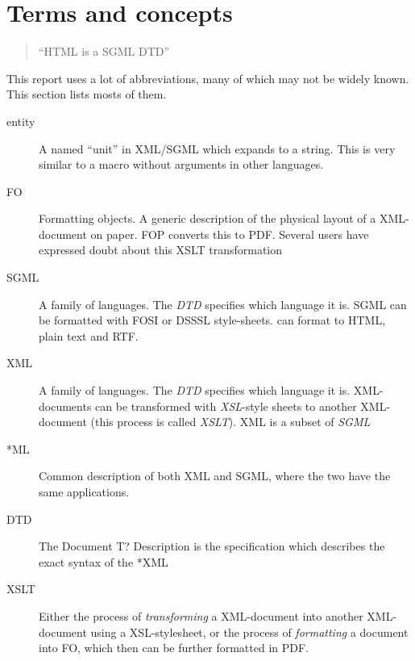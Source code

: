 
\chapter{Terms and concepts}
\label{cha:terms-and-concepts}

\begin{quotation}
  ``HTML is a SGML DTD''
\end{quotation}

This report uses a lot of abbreviations, many of which may not be
widely known.  This section lists mosts of them.

\begin{description}

\item[entity] A named ``unit'' in XML/SGML which expands to a string.
  This is very similar to a macro without arguments in other
  languages.
  
\item[FO] Formatting objects.  A generic description of the physical
  layout of a XML-document on paper.  FOP converts this to PDF.
  \textsf{Several users have expressed doubt about this XSLT
    transformation}
  
\item[SGML] A family of languages.  The \textit{DTD} specifies which
  language it is.  SGML can be formatted with FOSI or DSSSL
  style-sheets.   can format to HTML, plain text and
  RTF. 
  
\item[XML] A family of languages.  The \textit{DTD} specifies which
  language it is.  XML-documents can be transformed with
  \textit{XSL}-style sheets to another XML-document (this process is
  called \textit{XSLT}).  XML is a subset of \textit{SGML}


\item[*ML] Common description of both XML and SGML, where the two have
  the same applications.

\item[DTD] The \textsf{Document T? Description} is the specification
  which describes the exact syntax of the *XML


\item[XSLT] Either the process of \textit{transforming} a XML-document into
  another XML-document using a XSL-stylesheet, or the process of
  \textit{formatting} a document into FO, which then can be further
  formatted in PDF.


\end{description}
